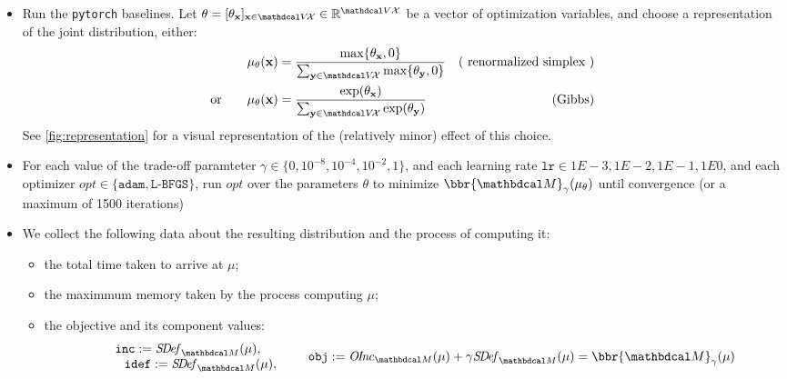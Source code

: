 \begin{subappendices}
\begin{itemize}
    \item Run the \texttt{pytorch} baselines.
    Let $\theta = [\theta_{\mat x}]_{\mat x \in \V\!\X} \in \mathbb R^{\V\X}$ be a vector of optimization variables, and choose a representation of the joint distribution, either:
    \begin{align*}
        \mu_{\theta}(\mat x) &= \frac{\max\{\theta_{\mat x}, 0\} }
            {\sum_{\mat y \in \V\!\X}\max\{\theta_{\mat y}, 0\} }
        &(\text{ renormalized simplex }) \\
    \text{or}\qquad
    \mu_{\theta}(\mat x) &= \frac{\exp(\theta_{\mat x})}{\sum_{\mat y \in \V\!\X} \exp(\theta_{\mat y})} & (\text{Gibbs})
    \end{align*}
    See \cref{fig:representation} for a visual representation of the (relatively minor) effect of this choice. 
    \item
    For each value of the trade-off paramteter 
    $\gamma \in \{0, 10^{-8}, 10^{-4}, 10^{-2}, 1\}$, and each learning rate $\texttt{lr} \in 1E-3, 1E-2, 1E-1, 1E0$, and each optimizer $\mathit{opt} \in \{\texttt{adam}, \texttt{L-BFGS}\}$,
    run $\mathit{opt}$ over the parameters $\theta$ to minimize $\bbr{\dg M}_\gamma(\mu_{\theta})$
     until convergence (or a maximum of 1500 iterations)

     \item We collect the following data about the resulting distribution and the process of computing it:
     \begin{itemize}[nosep]
         \item the total time taken to arrive at $\mu$;
         \item the maximmum memory taken by the process computing $\mu$;
         \item the objective and its component values:
         \vspace{-1ex}
         \[
            \begin{array}{c}
            \texttt{inc} := \SDef_{\dg M}(\mu), \\
            \qquad \texttt{idef} := \SDef_{\dg M}(\mu),
            \end{array}
            \qquad \texttt{obj} := \OInc_{\dg M}(\mu) + \gamma \SDef_{\dg M}(\mu) = \bbr{\dg M}_\gamma(\mu)
        \]
     \end{itemize}
\end{itemize}




\end{subappendices}
